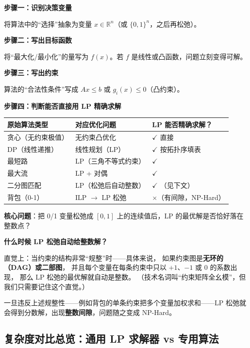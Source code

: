 \documentclass[12pt, a4paper]{ctexart}
\begin{document}
\begin{blackboard}[转化路线图]

\textbf{步骤一：识别决策变量}

将算法中的``选择''抽象为变量 $x \in \mathbb{R}^n$（或 $\{0,1\}^n$，之后再松弛）。

\textbf{步骤二：写出目标函数}

将``最大化/最小化''的量写为 $f(x)$。若 $f$ 是线性或凸函数，问题立刻变得可解。

\textbf{步骤三：写出约束}

算法的``合法性条件''写成 $Ax \leq b$ 或 $g_i(x) \leq 0$（凸约束）。

\textbf{步骤四：判断能否直接用 LP 精确求解}

\begin{center}
\begin{tabular}{lll}
\toprule
原始算法类型 & 对应优化问题 & LP 能否精确求解？ \\
\midrule
贪心（无约束极值） & 无约束凸优化 & $\checkmark$ 直接 \\
DP（线性递推） & 线性规划（LP） & $\checkmark$ 按拓扑序填表 \\
最短路 & LP（三角不等式约束） & $\checkmark$ \\
最大流 & LP + 对偶 & $\checkmark$ \\
二分图匹配 & LP（松弛后自动整数） & $\checkmark$ （见下文） \\
背包（0-1） & ILP $\to$ LP 松弛 & $\times$（有间隙，NP-Hard） \\
\bottomrule
\end{tabular}
\end{center}

\textbf{核心问题}：把 0/1 变量松弛成 $[0,1]$ 上的连续值后，LP 的最优解是否恰好落在整数点？

\textbf{什么时候 LP 松弛自动给整数解？}

直觉上：当约束的结构非常``规整''时——具体来说，
如果约束图是\textbf{无环的（DAG）或二部图}，
并且每个变量在每条约束中只以 $+1$、$-1$ 或 $0$ 的系数出现，
那么 LP 松弛的最优解就自动是整数。
（技术名词叫``约束矩阵全幺模''，但我们只需要记住这个直觉。）

一旦违反上述规整性——例如背包的单条约束把多个变量加权求和——LP 松弛就会得到分数解，出现\textbf{整数间隙}，问题随之变成 NP-Hard。

\end{blackboard}

\subsection{复杂度对比总览：通用 LP 求解器 vs 专用算法}
\end{document}
